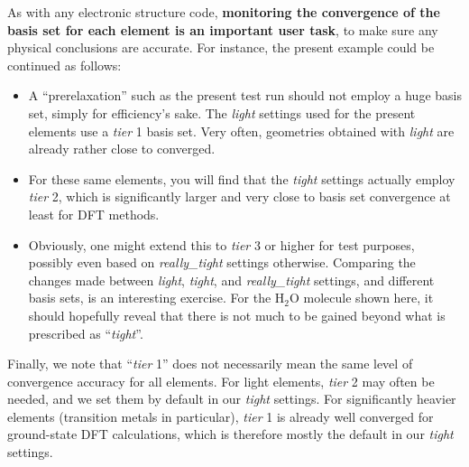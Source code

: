 As with any electronic structure code, \textbf{monitoring the convergence of
the basis set for each element is an important user task}, to make sure any
physical conclusions are accurate. For instance, the present example could be
continued as follows:
\begin{itemize}
  \item A ``prerelaxation'' such as the present test run should
    not employ a huge basis set, simply for efficiency's sake. The
    \emph{light} settings used for the present elements use a \emph{tier} 1
    basis set. Very often, geometries obtained with \emph{light} are already
    rather close to converged.
  \item For these same elements, you will find that the \emph{tight} settings
    actually employ \emph{tier} 2, which is significantly larger and very
    close to basis set convergence at least for DFT methods. 
  \item Obviously, one might extend this to \emph{tier} 3 or higher for test
    purposes, possibly even based on \emph{really\_tight} settings
    otherwise. Comparing the changes made between \emph{light}, \emph{tight},
    and \emph{really\_tight} settings, and different basis sets, is an 
    interesting exercise. For the H$_2$O molecule shown here, it should
    hopefully reveal that there is not much to be gained beyond what is
    prescribed as ``\emph{tight}''.
\end{itemize}
Finally, we note that ``\emph{tier} 1'' does not necessarily mean the same
level of convergence accuracy for all elements. For light elements,
\emph{tier} 2 may often be needed, and we set them by default in our
\emph{tight} settings. For significantly heavier elements (transition 
metals in particular), \emph{tier} 1  is already well converged for 
ground-state DFT calculations, which is therefore mostly the default in our
\emph{tight} settings. 
